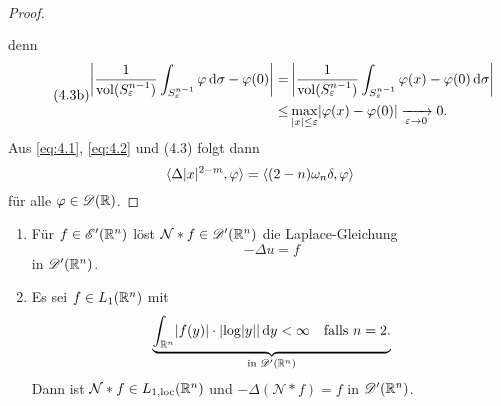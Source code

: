 \begin{proof}
\begin{align}
\begin{aligned}
  \end{aligned}
  \end{align}
    denn
  \begin{align}\tag{4.3b}
  \begin{aligned}
    \left\lvert \frac{1}{\operatorname{vol}(S^{n-1}_\varepsilon)}\int_{S^{n-1}_\varepsilon}\varphi\,\mathrm{d}\sigma-\varphi(0)\right\rvert
    =&\left\lvert \frac{1}{\operatorname{vol}(S^{n-1}_\varepsilon)}\int_{S^{n-1}_\varepsilon}\varphi(x)-\varphi(0)\,\mathrm{d}\sigma\right\rvert \\
    \leq& \max_{\lvert x\rvert\leq\varepsilon}\lvert \varphi(x)-\varphi(0)\rvert\xrightarrow[\varepsilon\rightarrow0]{}0.
  \end{aligned}
\end{align}
Aus \eqref{eq:4.1}, \eqref{eq:4.2} und (4.3) folgt dann
\[ \langle\Delta\lvert x\rvert^{2-m},\varphi\rangle=\langle(2-n)\omega_n\delta,\varphi\rangle \]
für alle $\varphi\in\mathscr{D}(\mathbb{R})$.
\end{proof}

\begin{kor}
  \label{kor:4.5}
  \begin{enumerate}[\rm(a)]
  \item \label{kor:4.5-1} Für $f\in\mathscr{E}'(\mathbb{R}^n)$ löst $\mathcal{N}\ast f\in\mathscr{D}'(\mathbb{R}^n)$ die Laplace-Gleichung 
    \[ -\Delta u=f \] 
    in $\mathscr{D}'(\mathbb{R}^n)$.
  \item \label{kor:4.5-2} Es sei $f\in L_1(\mathbb{R}^n)$ mit
    \[
    \underbrace{\int_{\mathbb{R}^n}\lvert f(y)\rvert\cdot\lvert \log\lvert y\rvert\rvert\,\mathrm{d} y<\infty\quad\text{falls }n=2.}_{\text{in }\mathscr{D}'(\mathbb{R}^n)}
    \]
    Dann ist $\mathcal{N}\ast f\in L_{1,\scriptsize{\textnormal{loc}}}(\mathbb{R}^n)$ und $-\Delta(\mathcal{N}\ast f)=f$ in $\mathscr{D}'(\mathbb{R}^n)$.
  \end{enumerate}
\end{kor}

